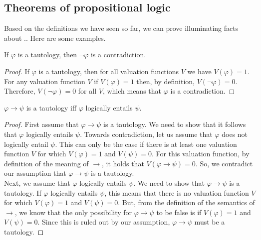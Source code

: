 \documentclass[nobib,nofonts]{tufte-handout}
\newcommand{\proplog}{\acro{PropLog}}
\begin{document}
\subsection{Theorems of propositional logic}

Based on the definitions we have seen so far, we can prove illuminating facts about \proplog..
Here are some examples.

\begin{proposition}
 If $\varphi$ is a tautology, then $\neg \varphi$ is a contradiction.
\end{proposition}

\begin{proof}
  If $\varphi$ is a tautology, then for all valuation functions $V$ we have $V(\varphi) = 1$. For any valuation function $V$ if $V(\varphi) = 1$ then, by definition, $V(\neg \varphi) = 0$. Therefore, $V(\neg \varphi) = 0$ for all $V$, which means that $\varphi$ is a contradiction.
\end{proof}

\begin{proposition}
 $\varphi \rightarrow \psi$ is a tautology iff $\varphi$ logically entails $\psi$.
\end{proposition}

\begin{proof}
  First assume that $\varphi \rightarrow \psi$ is a tautology. We need to show that it follows that $\varphi$ logically entails $\psi$. Towards contradiction, let us assume that $\varphi$ does not logically entail $\psi$. This can only be the case if there is at least one valuation function $V$ for which $V(\varphi) = 1$ and $V(\psi) = 0$. For this valuation function, by definition of the meaning of $\rightarrow$, it holds that $V(\varphi \rightarrow \psi)=0$. So, we contradict our assumption that $\varphi \rightarrow \psi$ is a tautology. \\
  Next, we assume that $\varphi$ logically entails $\psi$. We need to show that $\varphi \rightarrow \psi$ is a tautology. If $\varphi$ logically entails $\psi$, this means that there is no valuation function $V$ for which $V(\varphi)=1$ and $V(\psi)=0$. But, from the definition of the semantics of $\rightarrow$, we know that the only possibility for $\varphi \rightarrow \psi$ to be false is if $V(\varphi)=1$ and $V(\psi)=0$. Since this is ruled out by our assumption, $\varphi \rightarrow \psi$ must be a tautology.
\end{proof}
\end{document}
